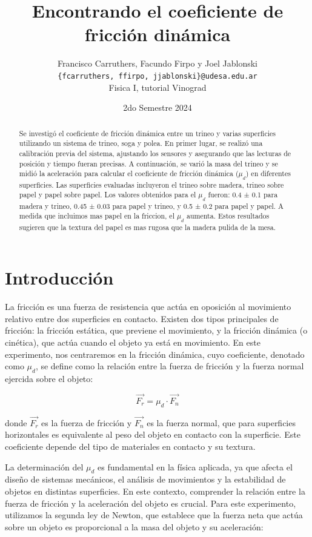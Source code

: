 \documentclass[12pt,a4]{article}
\title{Encontrando el coeficiente de fricción dinámica}
\author{Francisco Carruthers, Facundo Firpo y Joel Jablonski\\ [2mm]
\small \texttt{\{fcarruthers, ffirpo, jjablonski\}@udesa.edu.ar}\\
\small Fisica I, tutorial Vinograd}
\date{2do Semestre 2024}
\begin{document}
\maketitle

\begin{abstract}
    Se investigó el coeficiente de fricción dinámica entre un trineo y varias superficies utilizando un sistema de trineo, soga y polea. En primer lugar, se realizó una calibración previa del sistema, ajustando los sensores y asegurando que las lecturas de posición y tiempo fueran precisas. A continuación, se varió la masa del trineo y se midió la aceleración para calcular el coeficiente de fricción dinámica ($\mu_d$) en diferentes superficies. Las superficies evaluadas incluyeron el trineo sobre madera, trineo sobre papel y papel sobre papel. Los valores obtenidos para el $\mu_d$ fueron: 0.4 ± 0.1 para madera y trineo, 0.45 ± 0.03 para papel y trineo, y 0.5 ± 0.2 para papel y papel. A medida que incluimos mas papel en la friccion, el $\mu_d$ aumenta. Estos resultados sugieren que la textura del papel es mas rugosa que la madera pulida de la mesa.
\end{abstract}

\section{Introducción}

La fricción es una fuerza de resistencia que actúa en oposición al movimiento relativo entre dos superficies en contacto. Existen dos tipos principales de fricción: la fricción estática, que previene el movimiento, y la fricción dinámica (o cinética), que actúa cuando el objeto ya está en movimiento. En este experimento, nos centraremos en la fricción dinámica, cuyo coeficiente, denotado como \(\mu_d\), se define como la relación entre la fuerza de fricción y la fuerza normal ejercida sobre el objeto:

\[
\vec{F_r} = \mu_d \cdot \vec{F_n}
\]

donde \(\vec{F_r}\) es la fuerza de fricción y \(\vec{F_n}\) es la fuerza normal, que para superficies horizontales es equivalente al peso del objeto en contacto con la superficie. Este coeficiente depende del tipo de materiales en contacto y su textura.

La determinación del $\mu_d$ es fundamental en la física aplicada, ya que afecta el diseño de sistemas mecánicos, el análisis de movimientos y la estabilidad de objetos en distintas superficies. En este contexto, comprender la relación entre la fuerza de fricción y la aceleración del objeto es crucial. Para este experimento, utilizamos la segunda ley de Newton, que establece que la fuerza neta que actúa sobre un objeto es proporcional a la masa del objeto y su aceleración:
\end{document}

